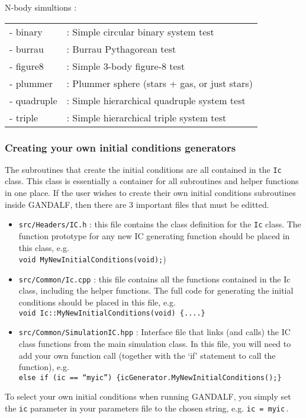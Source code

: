 \documentclass[a4paper]{article}
\newcommand{\var}[1]{\texttt{#1}}
\begin{document}
\noindent N-body simultions : \\
\newline
\begin{tabular}{ll}
- binary    &: Simple circular binary system test \\
- burrau    &: Burrau Pythagorean test \\
- figure8   &: Simple 3-body figure-8 test \\
- plummer   &: Plummer sphere (stars + gas, or just stars) \\
- quadruple &: Simple hierarchical quadruple system test \\
- triple    &: Simple hierarchical triple system test
\end{tabular}
\newline
\newline

\subsubsection{Creating your own initial conditions generators}
The subroutines that create the initial conditions are all contained in the \var{Ic} class.  This class is essentially a container for all subroutines and helper functions in one place.  If the user wishes to create their own initial conditions subroutines inside GANDALF, then there are 3 important files that must be editted.
\begin{itemize}
\item \var{src/Headers/IC.h} : this file contains the class definition for the \var{Ic} class.  The function prototype for any new IC generating function should be placed in this class, e.g. \\
\newline
\var{void MyNewInitialConditions(void);})
\item \var{src/Common/Ic.cpp} : this file contains all the functions contained in the Ic class, including the helper functions.  The full code for generating the initial conditions should be placed in this file, e.g. \\
\newline
\var{void Ic::MyNewInitialConditions(void) \{....\} }
\item \var{src/Common/SimulationIC.hpp} : Interface file that links (and calls) the IC class functions from the main simulation class.  In this file, you will need to add your own function call (together with the `if' statement to call the function), e.g. \\
\newline
\var{else if (ic == ``myic'') \{icGenerator.MyNewInitialConditions();\}}
\end{itemize}
To select your own initial conditions when running GANDALF, you simply set the \var{ic} parameter in your parameters file to the chosen string, e.g. \var{ic = myic}\,.
\end{document}
